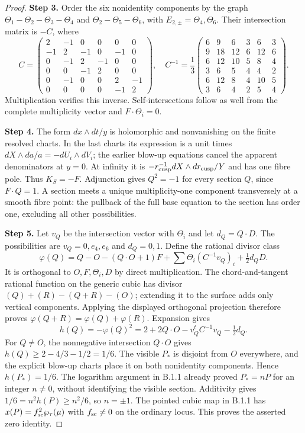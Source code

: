 \documentclass[11pt,a4paper]{article}
\theoremstyle{plain}
\theoremstyle{definition}
\begin{document}
\begin{proof}
\par\smallskip\noindent\textbf{Step 3.} Order the six nonidentity components by the graph
$\Theta_1-\Theta_2-\Theta_3-\Theta_4$ and $\Theta_2-\Theta_5-\Theta_6$, with $E_{2,\pm}=\Theta_4,\Theta_6$. Their intersection matrix is $-C$, where
\[
 C=\begin{pmatrix}2&-1&0&0&0&0\\-1&2&-1&0&-1&0\\0&-1&2&-1&0&0\\0&0&-1&2&0&0\\0&-1&0&0&2&-1\\0&0&0&0&-1&2\end{pmatrix},\quad
 C^{-1}=\frac13\begin{pmatrix}6&9&6&3&6&3\\9&18&12&6&12&6\\6&12&10&5&8&4\\3&6&5&4&4&2\\6&12&8&4&10&5\\3&6&4&2&5&4\end{pmatrix}.
\]
Multiplication verifies this inverse. Self-intersections follow as well from the complete multiplicity vector and $F\cdot\Theta_i=0$.

\par\smallskip\noindent\textbf{Step 4.} The form $dx\wedge dt/y$ is holomorphic and nonvanishing on the finite resolved charts. In the last charts its expression is a unit times $dX\wedge da/a=-dU_i\wedge dV_i$; the earlier blow-up equations cancel the apparent denominators at $y=0$. At infinity it is $-r_{\rm cusp}^{-1}dX\wedge d r_{\rm cusp}/Y$ and has one fibre pole. Thus $K_S=-F$. Adjunction gives $Q^2=-1$ for every section $Q$, since $F\cdot Q=1$. A section meets a unique multiplicity-one component transversely at a smooth fibre point: the pullback of the full base equation to the section has order one, excluding all other possibilities.

\par\smallskip\noindent\textbf{Step 5.} Let $v_Q$ be the intersection vector with $\Theta_i$ and let $d_Q=Q\cdot D$. The possibilities are $v_Q=0,e_4,e_6$ and $d_Q=0,1$. Define the rational divisor class
\[
 \varphi(Q)=Q-O-(Q\cdot O+1)F+\sum\Theta_i(C^{-1}v_Q)_i+\tfrac12d_QD.
\]
It is orthogonal to $O,F,\Theta_i,D$ by direct multiplication. The chord-and-tangent rational function on the generic cubic has divisor $(Q)+(R)-(Q+R)-(O)$; extending it to the surface adds only vertical components. Applying the displayed orthogonal projection therefore proves $\varphi(Q+R)=\varphi(Q)+\varphi(R)$. Expansion gives
\[
 h(Q)=-\varphi(Q)^2=2+2Q\cdot O-v_Q^tC^{-1}v_Q-\tfrac12d_Q.
\]
For $Q\ne O$, the nonnegative intersection $Q\cdot O$ gives $h(Q)\ge2-4/3-1/2=1/6$. The visible $P_*$ is disjoint from $O$ everywhere, and the explicit blow-up charts place it on both nonidentity components. Hence $h(P_*)=1/6$. The logarithm argument in B.1.1 already proved $P_*=nP$ for an integer $n\ne0$, without identifying the visible section. Additivity gives $1/6=n^2h(P)\ge n^2/6$, so $n=\pm1$. The pointed cubic map in B.1.1 has $x(P)=f_{\rm sc}^2\wp_\tau(\mu)$ with $f_{\rm sc}\ne0$ on the ordinary locus. This proves the asserted zero identity.
\end{proof}
\end{document}
